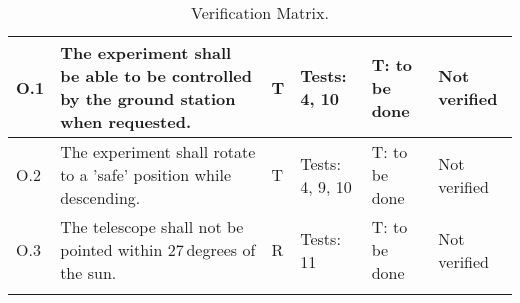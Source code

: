 \begin{longtable}[]{|m{}| m{}|m{}|m{}|m{}|m{}|}
O.1 & The experiment shall be able to be controlled by the ground station when requested.
& T & Tests: 4, 10 & T: to be done & Not verified \\\hline

O.2 & The experiment shall rotate to a 'safe' position while descending.
& T & Tests: 4, 9, 10 & T: to be done & Not verified \\\hline

\rowcolor{yellow} O.3 & The telescope shall not be pointed within 27\,degrees of the sun.
& R & Tests: 11 & T: to be done & Not verified \\\hline

\caption{Verification Matrix.}
\label{tab:var-mat}
\end{longtable}
\raggedbottom